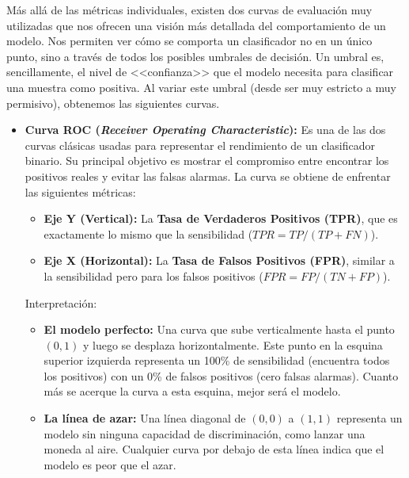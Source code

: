 Más allá de las métricas individuales, existen dos curvas de evaluación muy utilizadas que nos ofrecen una visión más detallada del comportamiento de un modelo. Nos permiten ver cómo se comporta un clasificador no en un único punto, sino a través de todos los posibles umbrales de decisión. Un umbral es, sencillamente, el nivel de <<confianza>> que el modelo necesita para clasificar una muestra como positiva. Al variar este umbral (desde ser muy estricto a muy permisivo), obtenemos las siguientes curvas.

\begin{itemize}
	\item \textbf{Curva ROC (\textit{Receiver Operating Characteristic}):} Es una de las dos curvas clásicas usadas para representar el rendimiento de un clasificador binario. Su principal objetivo es mostrar el compromiso entre encontrar los positivos reales y evitar las falsas alarmas. La curva se obtiene de enfrentar las siguientes métricas:
	
	\begin{itemize}
		\item \textbf{Eje Y (Vertical):} La \textbf{Tasa de Verdaderos Positivos (TPR)}, que es exactamente lo mismo que la sensibilidad ($TPR = TP/(TP + FN)$).
		
		\item \textbf{Eje X (Horizontal):} La \textbf{Tasa de Falsos Positivos (FPR)}, similar a la sensibilidad pero para los falsos positivos ($FPR = FP/(TN + FP)$).
	\end{itemize}
	
	
	Interpretación:
	
	\begin{itemize}
		\item \textbf{El modelo perfecto:} Una curva que sube verticalmente hasta el punto $(0, 1)$ y luego se desplaza horizontalmente. Este punto en la esquina superior izquierda representa un 100\% de sensibilidad (encuentra todos los positivos) con un 0\% de falsos positivos (cero falsas alarmas). Cuanto más se acerque la curva a esta esquina, mejor será el modelo.
		
		\item \textbf{La línea de azar:} Una línea diagonal de $(0,0)$ a $(1,1)$ representa un modelo sin ninguna capacidad de discriminación, como lanzar una moneda al aire. Cualquier curva por debajo de esta línea indica que el modelo es peor que el azar.
		

\end{itemize}
\end{itemize}
